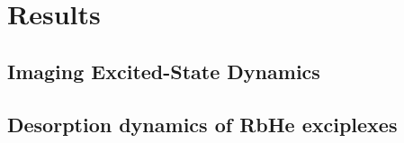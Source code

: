 \chapter{Results}
	\section{Imaging Excited-State Dynamics}
		

	\section{Desorption dynamics of RbHe exciplexes}
		